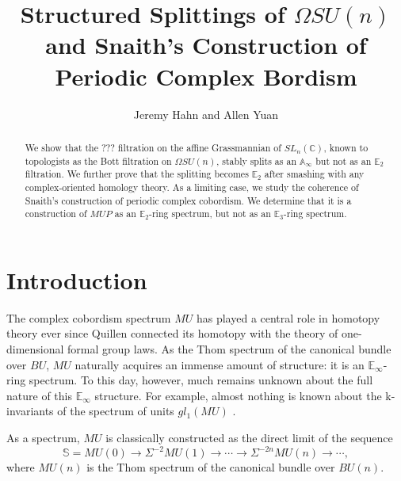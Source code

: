 \documentclass[reqno, oneside]{amsart}
\theoremstyle{definition}
\theoremstyle{plain}
\begin{document}
\title{Structured Splittings of $\Omega SU(n)$ and Snaith's Construction of Periodic Complex Bordism}
\author{Jeremy Hahn and Allen Yuan}

\begin{abstract}
We show that the ??? filtration on the affine Grassmannian of $SL_n(\mathbb{C})$, known to topologists as the Bott filtration on $\Omega SU(n)$, stably splits as an $\mathbb{A}_\infty$ but not as an $\mathbb{E}_2$ filtration.  We further prove that the splitting becomes $\mathbb{E}_2$ after smashing with any complex-oriented homology theory.  As a limiting case, we study the coherence of Snaith's construction of periodic complex cobordism.  We determine that it is a construction of $MUP$ as an $\mathbb{E}_2$-ring spectrum, but not as an $\mathbb{E}_3$-ring spectrum.
\end{abstract}





\setcounter{tocdepth}{1}
\maketitle

\tableofcontents



\section{Introduction}

The complex cobordism spectrum $MU$ has played a central role in homotopy theory ever since Quillen \cite{Quillen} connected its homotopy with the theory of one-dimensional formal group laws.  As the Thom spectrum of the canonical bundle over $BU$, $MU$ naturally acquires an immense amount of structure: it is an $\mathbb{E}_\infty$-ring spectrum.  To this day, however, much remains unknown about the full nature of this $\mathbb{E}_\infty$ structure.  For example, almost nothing is known about the k-invariants of the spectrum of units $gl_1(MU)$ \cite{LawsonBP}.

As a spectrum, $MU$ is classically constructed as the direct limit of the sequence
$$\mathbb{S}=MU(0) \longrightarrow \Sigma^{-2} MU(1) \longrightarrow \cdots \longrightarrow \Sigma^{-2n} MU(n) \longrightarrow \cdots,$$
where $MU(n)$ is the Thom spectrum of the canonical bundle over $BU(n)$.
\end{document}
